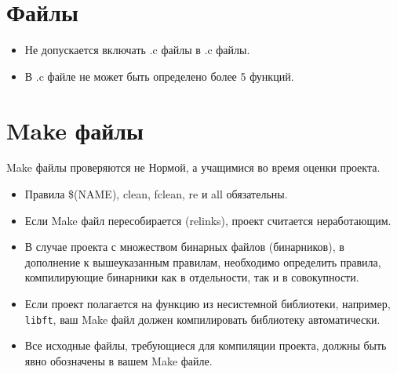 \documentclass{42-ru}
\begin{document}
    \section{Файлы}

        \begin{itemize}

            \item Не допускается включать .c файлы в .c файлы.

            \item В .c файле не может быть определено более 5 функций.

        \end{itemize}
        \newpage


    \section{Make файлы}

            Make файлы проверяются не Нормой, а учащимися во время оценки проекта.
            \begin{itemize}

                \item Правила \$(NAME), clean, fclean, re и all обязательны.

                \item Если Make файл пересобирается (relinks), проект считается неработающим.

                \item В случае проекта с множеством бинарных файлов (бинарников),
                    в дополнение к вышеуказанным правилам, необходимо определить правила,
                    компилирующие бинарники как в отдельности, так и в совокупности.

                \item Если проект полагается на функцию из несистемной библиотеки, например, \texttt{libft},
                    ваш Make файл должен компилировать библиотеку автоматически.

                \item Все исходные файлы, требующиеся для компиляции проекта,
                    должны быть явно обозначены в вашем Make файле.

            \end{itemize}
\end{document}
